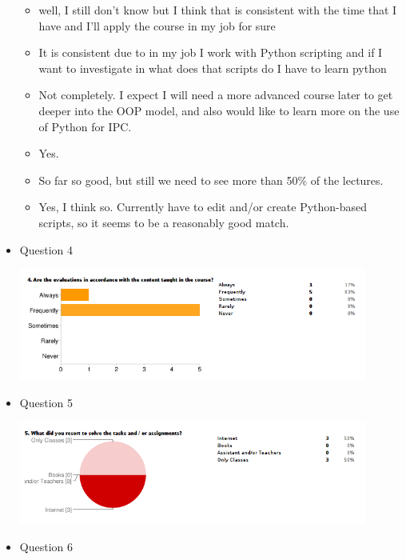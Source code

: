 \documentclass[letter, 10pt]{article}
\begin{document}
\begin{itemize}
    \begin{itemize}
        \item well, I still don't know but I think that is consistent with the time that I have and I'll apply the course in my job for sure
        \item It is consistent due to in my job I work with Python scripting and if I want to investigate in what does that scripts do  I have to learn python
        \item Not completely. I expect I will need a more advanced course later to get deeper into the OOP model, and also would like to learn more on the use of Python for IPC.
        \item Yes.
        \item So far so good, but still we need to see more than 50\% of the lectures.
        \item Yes, I think so. Currently have to edit and/or create Python-based scripts, so it seems to be a reasonably good match.
    \end{itemize}
    

    \item Question 4
        \begin{center}
            \includegraphics[width=0.9\textwidth]{img/survey_4.png}
        \end{center}
        

    \item Question 5
        \begin{center}
            \includegraphics[width=0.9\textwidth]{img/survey_5.png}
        \end{center}

    \item Question 6
        

\end{itemize}
\end{document}
